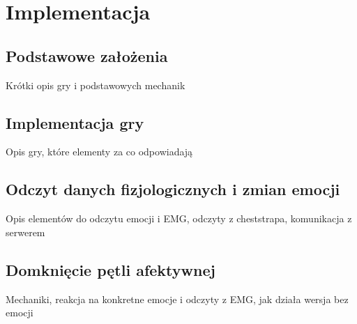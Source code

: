 \chapter{Implementacja}
\label{cha:implementacja}
\section{Podstawowe założenia}
Krótki opis gry i podstawowych mechanik
\section{Implementacja gry}
Opis gry, które elementy za co odpowiadają
\section{Odczyt danych fizjologicznych i zmian emocji}
Opis elementów do odczytu emocji i EMG, odczyty z cheststrapa, komunikacja z serwerem

\section{Domknięcie pętli afektywnej}
Mechaniki, reakcja na konkretne emocje i odczyty z EMG, jak działa wersja bez emocji